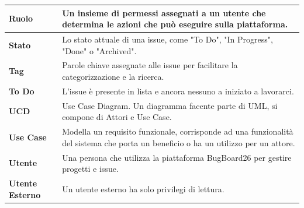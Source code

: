 \begin{table}[H]
\begin{tabularx}{\textwidth}{|l|X|}
    \hline
    \textbf{Ruolo} & Un insieme di permessi assegnati a un utente che determina le azioni che può eseguire sulla piattaforma. \\
    \hline
    \textbf{Stato} & Lo stato attuale di una issue, come "To Do", "In Progress", "Done" o "Archived". \\
    \hline
    \textbf{Tag} & Parole chiave assegnate alle issue per facilitare la categorizzazione e la ricerca. \\
    \hline
    \textbf{To Do} & L'issue è presente in lista e ancora nessuno a iniziato a lavorarci. \\
    \hline
    \textbf{UCD} & Use Case Diagram. Un diagramma facente parte di UML, si compone di Attori e Use Case. \\
    \hline
    \textbf{Use Case} & Modella un requisito funzionale, corrisponde ad una funzionalità del sistema che porta un beneficio o ha un utilizzo per un attore. \\
    \hline
    \textbf{Utente} & Una persona che utilizza la piattaforma BugBoard26 per gestire progetti e issue. \\
    \hline
    \textbf{Utente Esterno} & Un utente esterno ha solo privilegi di lettura. \\ 
    \hline
\end{tabularx}
\end{table}